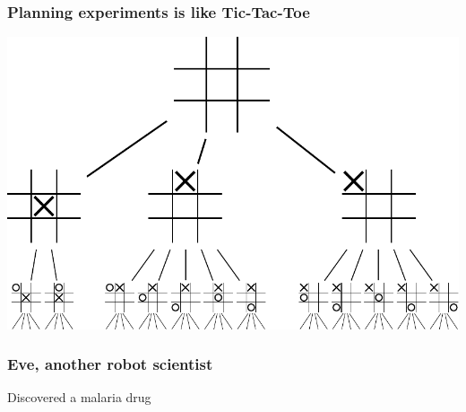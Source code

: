 \documentclass{beamer}
\begin{document}
\begin{frame}
  \frametitle{Planning experiments is like Tic-Tac-Toe}
  \begin{center}
    \includegraphics[width=\textwidth]{figures/Tic-tac-toe-game-tree}
  \end{center}
\end{frame}

\begin{frame}
  \frametitle{Eve, another robot scientist}
  \centering {}
  Discovered a malaria drug
\end{frame}
\end{document}
